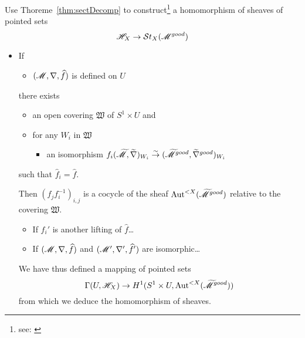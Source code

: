 \begin{comment}
  According to Thm~\ref{thm:sectDecomp} we can construct a homomorphism of sheaves of pointed
  sets
  \[
    \sH_X\to\St_X(\sM^{good})
  \]
\end{comment}
Use Thoreme~\ref{thm:sectDecomp} to construct\footnote{see:
\cite[p. 111f]{sabbah2007isomonodromic}} a homomorphism of sheaves of
pointed sets
\[
  \mathscr{H}_X\to\mathcal{S}{}t_X(\mathscr{M}^{good})
\]
\begin{itemize}
  \item If \begin{itemize}
      \item $(\mathscr{M},\nabla,\widehat f)$ is defined on $U$
    \end{itemize}
    there exists
    \begin{itemize}
      \item an open covering $\mathfrak{W}$ of $S^1\times U$ and
      \item for any $W_i$ in $\mathfrak{W}$
        \begin{itemize}
          \item an isomorphism
            $f_i(\widetilde{\mathscr{M}},\widetilde\nabla)_{W_i}
              \overset{\sim}{\to}
              (\widetilde{\mathscr{M}}^{good},\widetilde\nabla^{good})_{W_i}$
        \end{itemize}
    \end{itemize}
    such that $\hat f_i=\hat f$.

    Then $(f_jf_i^{-1})_{i,j}$ is a cocycle of the sheaf
    $\operatorname{Aut}^{<X}(\widetilde{\mathscr{M}}^{good})$ relative to the covering $\mathfrak{W}$.
    \begin{itemize}
      \item If $f_i'$ is another lifting of $\hat f$\dots
      \item If $(\mathscr{M},\nabla,\widehat f)$ and $(\mathscr{M}',\nabla',\widehat f')$ are
        isomorphic\dots 
    \end{itemize}
    We have thus defined a mapping of pointed sets
    \[
      \Gamma(U,\mathscr{H}_X)\to H^1(S^1\times U,\operatorname{Aut}^{<X}(\widetilde{\mathscr{M}}^{good}))
    \]
    from which we deduce the homomorphism of sheaves.
\end{itemize}

